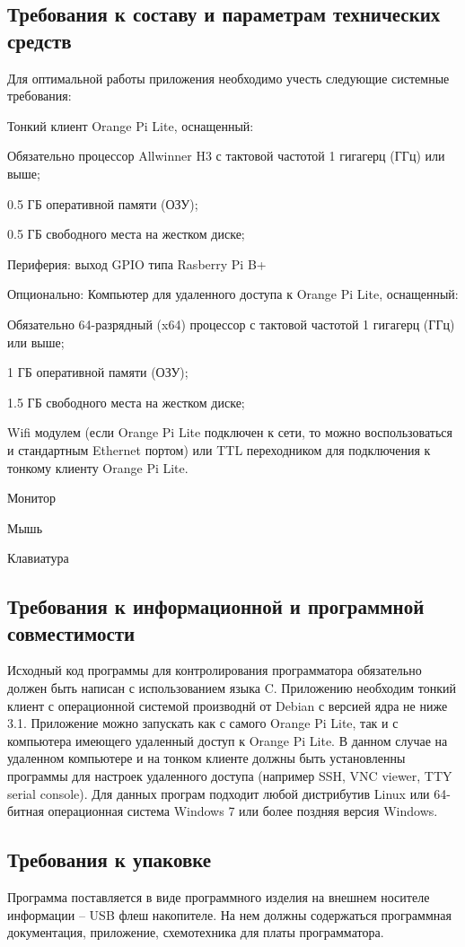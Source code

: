 \subsection{Требования к составу и параметрам технических средств}
Для оптимальной работы приложения необходимо учесть следующие системные требования:
\begin{my_enumerate}

\item Тонкий клиент Orange Pi Lite, оснащенный:
    \begin{my_enumerate}
    \item Обязательно процессор Allwinner H3 с тактовой частотой 1 гигагерц (ГГц) или выше;
    \item 0.5 ГБ оперативной памяти (ОЗУ);
    \item 0.5 ГБ свободного места на жестком диске;
    \item Периферия: выход GPIO типа Rasberry Pi B+
    \end{my_enumerate}
\item Опционально: Компьютер для удаленного доступа к Orange Pi Lite, оснащенный:
    \begin{my_enumerate}
    \item Обязательно 64-разрядный (x64) процессор с тактовой частотой 1 гигагерц (ГГц) или выше;
    \item 1 ГБ оперативной памяти (ОЗУ);
    \item 1.5 ГБ свободного места на жестком диске;
    \item Wifi модулем (если Orange Pi Lite подключен к сети, то можно воспользоваться и стандартным Ethernet портом) или TTL переходником для подключения к тонкому клиенту Orange Pi Lite.
    \end{my_enumerate}
\item Монитор
\item Мышь
\item Клавиатура
\end{my_enumerate}


\subsection{Требования к информационной и программной совместимости}
Исходный код программы для контролирования программатора обязательно должен быть написан с использованием языка C. Приложению необходим тонкий клиент с операционной системой производнй от Debian с версией ядра не ниже 3.1. Приложение можно запускать как с  самого Orange Pi Lite, так и с компьютера имеющего удаленный доступ к Orange Pi Lite. В данном случае на удаленном компьютере и на тонком клиенте должны быть установленны программы для настроек удаленного доступа (например SSH, VNC viewer, TTY serial console). Для данных програм подходит любой дистрибутив Linux или 64-битная операционная система Windows 7 или более поздняя версия Windows.


\subsection{Требования к упаковке}
Программа поставляется в виде программного изделия на внешнем носителе информации – USB флеш накопителе. На нем должны содержаться программная документация, приложение, схемотехника для платы программатора.
